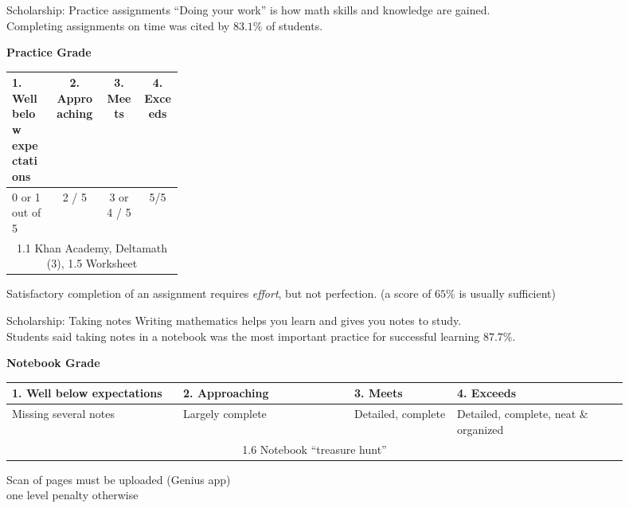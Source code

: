 \begin{frame}{Scholarship: Practice assignments}
  ``Doing your work'' is how math skills and knowledge are gained.\\[0.25cm]
  Completing assignments on time was cited by $83.1\%$ of students. \vspace{0.5cm}
    \begin{table}[ht]
      \textbf{Practice Grade}
    \begin{tabular}[t]{p{0.25\linewidth} c c c }%
      \hline
      1. Well below \newline expectations & 2. Approaching & 3. Meets & 4. Exceeds \\
      \hline
      \hspace{0.25cm} 0 or 1 out of 5 & 2 / 5 & 3 or 4 / 5 & 5/5 \\[0.25cm]
      \multicolumn{4}{c}{1.1 Khan Academy, Deltamath (3), 1.5 Worksheet} \\[0.25cm]
      \hline
    \end{tabular}
  \end{table} \vspace{0.25cm}
    Satisfactory completion of an assignment requires \emph{effort}, but not perfection. (a score of $65\%$ is usually sufficient)
    \vspace{1cm}
  \end{frame}

\begin{frame}{Scholarship: Taking notes}
  Writing mathematics helps you learn and gives you notes to study.\\[0.25cm]
    Students said taking notes in a notebook was the most important practice for successful learning $87.7\%$. \vspace{0.5cm}
    \begin{table}[ht]
      \textbf{Notebook Grade}
      \begin{tabular}[t]{p{0.25\linewidth} p{0.25\linewidth} p{0.15\linewidth} p{0.25\linewidth}}
        \hline
        1. Well below \newline expectations & 2. Approaching & 3. Meets & 4. Exceeds \\
        \hline
        Missing several notes & Largely complete & Detailed, \newline complete & Detailed, complete, neat \& organized \\[0.25cm]
        \multicolumn{4}{c}{1.6 Notebook ``treasure hunt''} \\[0.25cm]
        \hline
      \end{tabular}
    \end{table} \vspace{0.25cm}
  Scan of pages must be uploaded (Genius app) \\one level penalty otherwise \vspace{1cm}
\end{frame}

